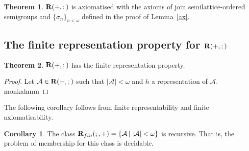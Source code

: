 \documentclass[a4paper]{article}
\theoremstyle{definition}
\theoremstyle{theorem}
\newtheorem{theorem}{Theorem}
\theoremstyle{proposition}
\theoremstyle{lemma}
\theoremstyle{ex}
\theoremstyle{corollary}
\newtheorem{corollary}{Corollary}
\theoremstyle{claim}
\begin{document}
\begin{theorem}
  ${\bf R}(+, ;)$ is axiomatised with the axioms of join semilattice-ordered semigroups and $\{ \sigma_n \}_{n < \omega}$ defined in the proof of Lemma~\ref{ax}.
\end{theorem}

\subsection{The finite representation property for ${\bf R}(+, ;)$}

\begin{theorem}
  ${\bf R}(+, ;)$ has the finite representation property.
\end{theorem}

\begin{proof}
  Let $\mathcal{A} \in {\bf R}(+, ;)$ such that $|\mathcal{A}| < \omega$ and $h$ a representation of $\mathcal{A}$. monkahmm
\end{proof}

The following corollary follows from finite representability and finite axiomatisability.

\begin{corollary}
  The class ${\bf R}_{fin}(;, +) = \{ \mathcal{A} \: | \: |\mathcal{A}| < \omega \}$ is recursive. That is, the problem of membership for this class is decidable.
\end{corollary}

\begin{comment}
\section{Acknowledgements}

The author is sincerely grateful to Robin Hirsch, Ian Hodkinson, Stepan Kuznetsov, Valentin Shehtman, Eugeny Zolin, and his supervisor Ilya Shapirovsky for valuable conversations.\\The previous version of this paper contained an error. Many thanks to Jas Semrl for noticing that.
\end{comment}



\end{document}
